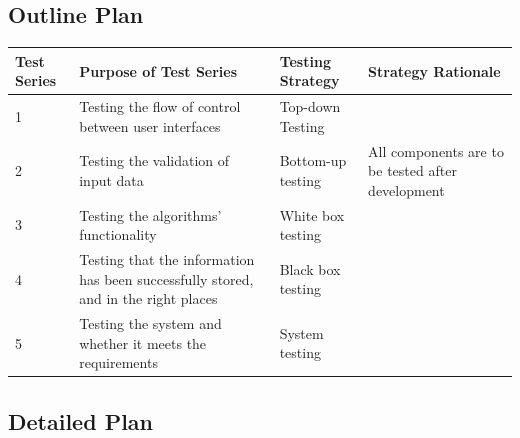 \begin{landscape}
\subsection{Outline Plan}

\begin{center}
    \begin{tabular}{|p{2cm}|p{5cm}|p{5cm}|p{4cm}|}
        \hline
        \textbf{Test Series} & \textbf{Purpose of Test Series} & \textbf{Testing Strategy} & \textbf{Strategy Rationale}\\ \hline
        1 & Testing the flow of control between user interfaces & Top-down Testing & \\ \hline
        2 & Testing the validation of input data & Bottom-up testing & All components are to be tested after development \\ \hline
        3 & Testing the algorithms' functionality & White box testing \\ \hline
        4 & Testing that the information has been successfully stored, and in the right places & Black box testing \\ \hline
        5 & Testing the system and whether it meets the requirements & System testing \\ \hline
    \end{tabular}
\end{center}

\subsection{Detailed Plan}


\end{landscape}
